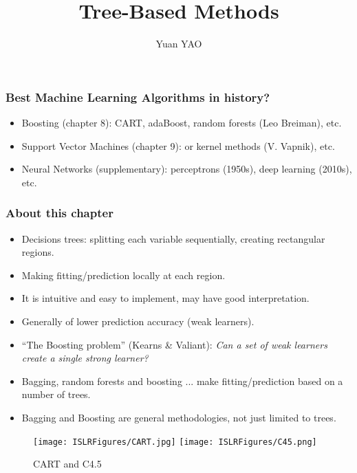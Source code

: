 \documentclass{beamer}
\title[]{Tree-Based Methods}
\author{Yuan YAO}
\institute[HKUST]
{
	Chapter 8 \\ 
	\medskip
	\textit{ } 
}
\begin{document}
	 	
	 	\begin{frame}
	 		\titlepage %
	 	\end{frame}
		
      \begin{frame}
      	\frametitle{Best Machine Learning Algorithms in history?}
      	\begin{itemize}
      		\item Boosting (chapter 8): CART, adaBoost, random forests (Leo Breiman), etc. 
      		\item Support Vector Machines (chapter 9): or kernel methods (V. Vapnik), etc.
      		\item Neural Networks (supplementary): perceptrons (1950s), deep learning (2010s), etc.
        	\end{itemize}
        \end{frame}


 \begin{frame}
 	\frametitle{ }
 	\tableofcontents
 \end{frame}
     

      
      \begin{frame}
      	\frametitle{About this chapter}
      	\begin{itemize}
      		\item  Decisions trees: splitting each variable sequentially, creating rectangular regions. 
      		\item  Making fitting/prediction locally at each region.
      		\item It is intuitive and easy to implement, may have good interpretation.
      		\item  Generally of lower prediction accuracy (weak learners).
		\item ``The Boosting problem'' (Kearns \& Valiant): \emph{Can a set of weak learners create a single strong learner?}
      		\item  Bagging, random forests and boosting ... make fitting/prediction based on a 
      		number of trees.
      		\item Bagging and Boosting are general methodologies, not just limited to trees.
        	\end{itemize}
        \end{frame}

        \begin{frame}{}

                    \begin{figure}
              \centering
                \texttt{[image: ISLRFigures/CART.jpg]}\quad
                \texttt{[image: ISLRFigures/C45.png]}
              \caption{CART and C4.5}
            \end{figure}

        \end{frame}
\end{document}
